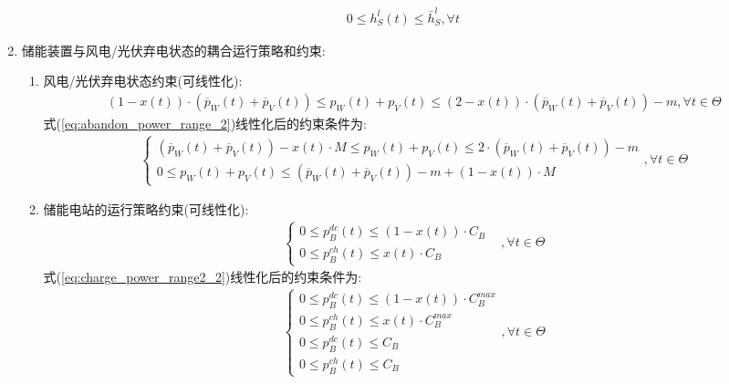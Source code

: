 \documentclass{article}
\begin{document}
\begin{enumerate}
{\begin{enumerate}
{                \begin{align}
                    0\leq h_S^l(t)\leq\bar{h}_S^l,\forall t
                \end{align}
            }
        \end{enumerate}
    }
    \item {储能装置与风电/光伏弃电状态的耦合运行策略和约束:
        \begin{enumerate}
            \item {风电/光伏弃电状态约束({\color{red}可线性化}):
                \begin{align}
                    \left(1-x(t)\right)\cdot\left(\overline{p}_W(t)+\overline{p}_V(t)\right)\leq p_W(t)+p_V(t)\leq\left(2-x(t)\right)\cdot\left(\overline{p}_W(t)+\overline{p}_V(t)\right)-m,\forall t\in\Theta \label{eq:abandon_power_range_2}
                \end{align}
                式(\ref{eq:abandon_power_range_2})线性化后的约束条件为:
                \begin{align}
                    \begin{cases}
                        \left(\overline{p}_W(t)+\overline{p}_V(t)\right)-x(t)\cdot M \leq p_W(t)+p_V(t)\leq 2\cdot\left(\overline{p}_W(t)+\overline{p}_V(t)\right)-m\\
                        0 \leq p_W(t)+p_V(t)\leq\left(\overline{p}_W(t)+\overline{p}_V(t)\right)-m+(1-x(t))\cdot M
                    \end{cases},\forall t\in\Theta
                \end{align}
            }
            \item {储能电站的运行策略约束({\color{red}可线性化}):
                \begin{align}
                    \begin{cases}0\leq p_B^{dc}\left(t\right)\leq\left(1-x(t)\right)\cdot C_B\\0\leq p_B^{ch}\left(t\right)\leq x(t)\cdot C_B&\end{cases},\forall t\in\Theta \label{eq:charge_power_range2_2}
                \end{align}
                式(\ref{eq:charge_power_range2_2})线性化后的约束条件为:
                \begin{align}
                    \begin{cases}
                        0\leq p_B^{dc}\left(t\right)\leq\left(1-x(t)\right)\cdot C_B^{max}\\
                        0\leq p_B^{ch}\left(t\right)\leq x(t)\cdot C_B^{max}\\
                        0\leq p_B^{dc}\left(t\right)\leq C_B\\
                        0\leq p_B^{ch}\left(t\right)\leq C_B
                    \end{cases},\forall t\in\Theta
                \end{align}
            }
        \end{enumerate}
    }
\end{enumerate}
\end{document}

